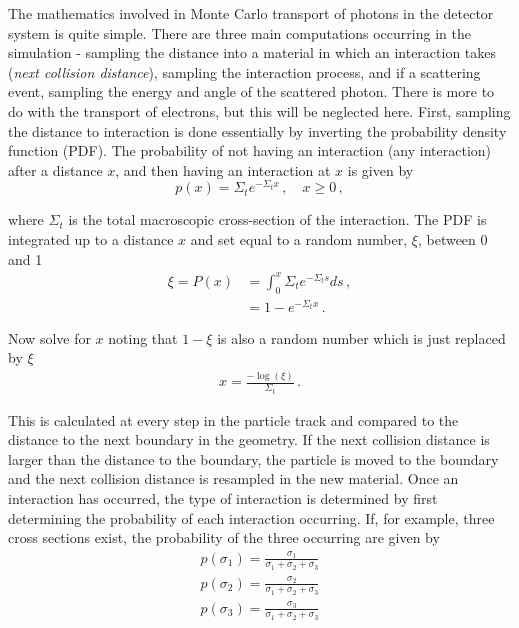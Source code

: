 \documentclass[10pt]{article}
\begin{document}
The mathematics involved in Monte Carlo transport of photons in the detector system is quite simple. There are three main computations occurring in the simulation - sampling the distance into a material in which an interaction takes (\emph{next collision distance}), sampling the interaction process, and if a scattering event, sampling the energy and angle of the scattered photon. There is more to do with the transport of electrons, but this will be neglected here. First, sampling the distance to interaction is done essentially by inverting the probability density function (PDF). The probability of not having an interaction (any interaction) after a distance $x$, and then having an interaction at $x$ is given by 
%
 \begin{equation}
	p(x) = \Sigma_t e^{-\Sigma_t x}\,, \quad x \geq 0\,,
\end{equation}

\noindent where $\Sigma_t$ is the total macroscopic cross-section of the interaction. The PDF is integrated up to a distance $x$ and set equal to a random number, $\xi$, between 0 and 1
%
 \begin{align}
	\xi = P(x) &= \int_0^x \Sigma_t e^{-\Sigma_t s} ds \,, \\
	&= 1-e^{-\Sigma_t x} \,.
\end{align}

\noindent Now solve for $x$ noting that $1-\xi$ is also a random number which is just replaced by $\xi$
%
 \begin{align}
	x = \frac{-\log(\xi)}{\Sigma_t} \,.
\end{align}

\noindent This is calculated at every step in the particle track and compared to the distance to the next boundary in the geometry. If the next collision distance is larger than the distance to the boundary, the particle is moved to the boundary and the next collision distance is resampled in the new material. Once an interaction has occurred, the type of interaction is determined by first determining the probability of each interaction occurring. If, for example, three cross sections exist, the probability of the three occurring are given by  
%
\begin{align}
	p(\sigma_1) = \frac{\sigma_1}{\sigma_1 + \sigma_2 + \sigma_3} \\
	p(\sigma_2) = \frac{\sigma_2}{\sigma_1 + \sigma_2 + \sigma_3} \\
	p(\sigma_3) = \frac{\sigma_3}{\sigma_1 + \sigma_2 + \sigma_3}
\end{align}
\end{document}
